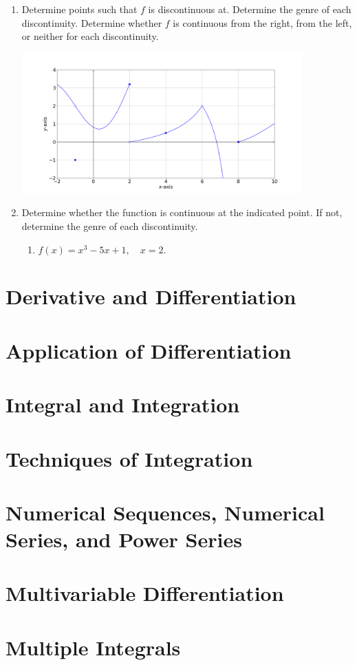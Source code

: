 \documentclass[11pt]{book}
\theoremstyle{break}
\theoremstyle{no_label}
\numberwithin{equation}{section}
\begin{document}
\begin{enumerate}[label=\arabic*.]
    \item Determine points such that $f$ is discontinuous at. Determine the genre of each discontinuity. Determine whether $f$ is continuous from the right, from the left, or neither for each discontinuity.
    \begin{center}
        \includegraphics[width=0.85\textwidth]{continuity_exercise_1.png}
    \end{center}
    \item Determine whether the function is continuous at the indicated point. If not, determine the genre of each discontinuity.
    \begin{enumerate}
        \item $f(x)=x^3-5x+1,\quad x=2$.
    \end{enumerate}
\end{enumerate}

\chapter{Derivative and Differentiation}



\chapter{Application of Differentiation}



\chapter{Integral and Integration}



\chapter{Techniques of Integration}



\chapter{Numerical Sequences, Numerical Series, and Power Series}



\chapter{Multivariable Differentiation}



\chapter{Multiple Integrals}
\end{document}
